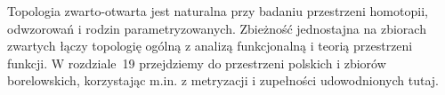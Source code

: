 \begin{uwaga}
Topologia zwarto-otwarta jest
naturalna przy badaniu przestrzeni
homotopii, odwzorowań i rodzin
parametryzowanych.
Zbieżność jednostajna na zbiorach
zwartych łączy topologię ogólną
z analizą funkcjonalną i teorią
przestrzeni funkcji.
W rozdziale~19 przejdziemy do
przestrzeni polskich i zbiorów
borelowskich, korzystając m.in.
z metryzacji i zupełności
udowodnionych tutaj.
\end{uwaga}
